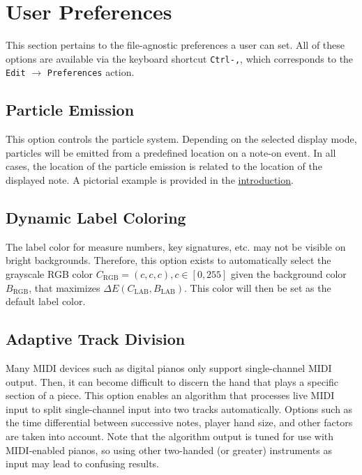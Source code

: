 \documentclass[english]{article}
\providecommand{\mi}[1]{\texttt{#1}}
\begin{document}
\section{User Preferences}

This section pertains to the file-agnostic preferences a user can set.
All of these options are available via the keyboard shortcut \mi{Ctrl-,},
which corresponds to the \mi{Edit} $\rightarrow$ \mi{Preferences} action.

\subsection{Particle Emission}

This option controls the particle system. Depending on the selected display mode, particles will be emitted from a 
predefined location on a note-on event. In all cases, the location of the particle emission is related to the location of the
displayed note. A pictorial example is provided in the 
\textcolor{lcol}{\hyperref[sec:intro]{introduction}}.

\subsection{Dynamic Label Coloring}

The label color for measure numbers, key signatures, etc. may not be visible on bright backgrounds. Therefore,
this option exists to automatically select the grayscale RGB color $C_\text{RGB}=(c,c,c), c \in [0, 255]$
given the background color $B_\text{RGB}$,
that maximizes $\Delta E(C_\text{LAB}, B_\text{LAB})$.
This color will then be set as the default label color.

\subsection{Adaptive Track Division}

Many MIDI devices such as digital pianos only support single-channel MIDI output. Then, it can become difficult to discern the
hand that plays a specific section of a piece. This option enables an algorithm that processes live MIDI input to split
single-channel input into two tracks automatically. Options such as the time differential between successive notes, 
player hand size, and other factors are taken into account. Note that the algorithm output is tuned for use with MIDI-enabled
pianos, so using other two-handed (or greater) instruments as input may lead to confusing results.
\end{document}

